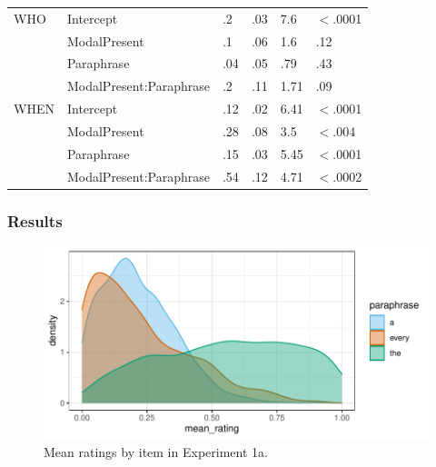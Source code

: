 \documentclass[12pt,letterpaper,table,svgnames,dvipsnames]{article}
\begin{document}
\begin{table}[p!]
\begin{center}
\begin{tabular}{l|lllll}
\bottomrule
\toprule
WHO & Intercept & .2 & .03 & 7.6 & $<$.0001\\
{} & ModalPresent & .1 & .06 & 1.6 & .12\\
{} & Paraphrase & .04 & .05 & .79 & .43\\
{} & ModalPresent:Paraphrase & .2 & .11 & 1.71 & .09\\
\bottomrule
\toprule
WHEN & Intercept & .12 & .02 & 6.41 & $<$.0001\\
{} & ModalPresent & .28 & .08 & 3.5 & $<$.004\\
{} & Paraphrase & .15 & .03 & 5.45 & $<$.0001\\
{} & ModalPresent:Paraphrase & .54 & .12 & 4.71 & $<$.0002\\
\bottomrule
\end{tabular} 
\end{center} 
\end{table}


\subsubsection{Results}

\begin{figure}[h!]
\centering
\includegraphics[scale=.8]{figures/ex1a_denisty_mean_ratings.pdf}
\caption{Mean ratings by item in Experiment 1a.}
\label{ex1a_density_mr}
\end{figure}
\end{document}
